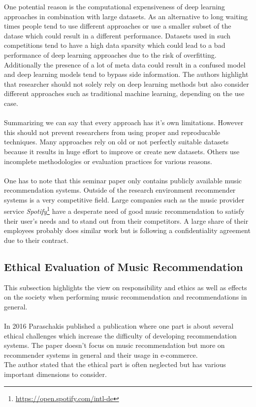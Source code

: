 \documentclass[runningheads,a4paper]{llncs}
\begin{document}
One potential reason is the computational expensiveness of deep learning approaches in combination with large datasets.
As an alternative to long waiting times people tend to use different approaches or use a smaller subset of the datase which could result in a different performance.
Datasets used in such competitions tend to have a high data sparsity which could lead to a bad performance of deep learning approaches due to the risk of overfitting. 
Additionally the presence of a lot of meta data could result in a confused model and deep learning models tend to bypass side information. 
The authors highlight that researcher should not solely rely on deep learning methods but also consider different approaches such as traditional machine learning, depending on the use case.\cite{jannach2020deep}\\
\\
Summarizing we can say that every approach has it's own limitations. However this should not prevent researchers from using proper and reproducable techniques. 
Many approaches rely on old or not perfectly suitable datasets because 
it results in huge effort to improve or create new datasets. Others use incomplete methodologies or evaluation practices for various reasons.\\
\\
One has to note that this seminar paper only contains publicly available music recommendation systems.
Outside of the research environment recommender systems is a very competitive field. 
Large companies such as the music provider service \textit{Spotify}\footnote{\url{https://open.spotify.com/intl-de}}
have a desperate need of good music recommendation to satisfy their user's needs and to stand out from their competitors. 
A large share of their employees probably does similar work but 
is following a confidentiality agreement due to their contract.
\subsection{Ethical Evaluation of Music Recommendation}
This subsection highlights the view on responsibility and ethics as well as effects on the society when performing music recommendation and recommendations in general. \\
\\
In 2016 Paraschakis published a publication where one part is about several ethical challenges 
which increase the difficulty of developing recommendation systems. The paper doesn't focus on music recommendation but more on recommender systems in general and their usage in e-commerce.\\
The author stated that the ethical part is often neglected but has various important dimensions to consider.
\end{document}
